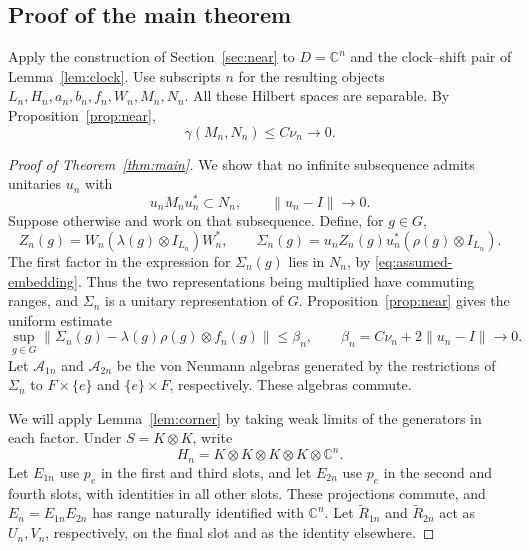 \subsection{Proof of the main theorem}
Apply the construction of Section~\ref{sec:near} to
$D=\mathbb C^n$ and the clock--shift pair of Lemma~\ref{lem:clock}.
Use subscripts $n$ for the resulting objects $L_n,H_n,a_n,b_n,f_n,W_n,
M_n,N_n$. All these Hilbert spaces are separable. By
Proposition~\ref{prop:near},
\begin{equation}\label{eq:vanishing-gap}
 \gamma(M_n,N_n)\leq C\nu_n\longrightarrow0.
\end{equation}

\begin{proof}[Proof of Theorem~\ref{thm:main}]
We show that no infinite subsequence admits unitaries $u_n$ with
\begin{equation}\label{eq:assumed-embedding}
 u_nM_nu_n^*\subset N_n,\qquad\|u_n-I\|\longrightarrow0.
\end{equation}
Suppose otherwise and work on that subsequence. Define, for $g\in G$,
\[
 Z_n(g)=W_n(\lambda(g)\otimes I_{L_n})W_n^*,\qquad
 \Sigma_n(g)=u_nZ_n(g)u_n^*(\rho(g)\otimes I_{L_n}).
\]
The first factor in the expression for $\Sigma_n(g)$ lies in $N_n$,
by \eqref{eq:assumed-embedding}. Thus the two representations being
multiplied have commuting ranges, and $\Sigma_n$ is a unitary
representation of $G$. Proposition~\ref{prop:near} gives the uniform
estimate
\begin{equation}\label{eq:sigma-bound}
 \sup_{g\in G}
 \bigl\|\Sigma_n(g)-\lambda(g)\rho(g)\otimes f_n(g)\bigr\|
 \leq\beta_n,
 \qquad \beta_n=C\nu_n+2\|u_n-I\|\longrightarrow0.
\end{equation}
Let $\mathcal A_{1n}$ and $\mathcal A_{2n}$ be the von Neumann
algebras generated by the restrictions of $\Sigma_n$ to $F\times\{e\}$
and $\{e\}\times F$, respectively. These algebras commute.

We will apply Lemma~\ref{lem:corner} by taking weak limits of the
generators in each factor. Under $S=K\otimes K$, write
\[
 H_n=K\otimes K\otimes K\otimes K\otimes\mathbb C^n.
\]
Let $E_{1n}$ use $p_e$ in the first and third slots, and let $E_{2n}$
use $p_e$ in the second and fourth slots, with identities in all
other slots. These projections commute, and
$E_n=E_{1n}E_{2n}$ has range naturally identified with $\mathbb C^n$.
Let $\widetilde R_{1n}$ and $\widetilde R_{2n}$ act as $U_n,V_n$,
respectively, on the final slot and as the identity elsewhere.


\end{proof}
